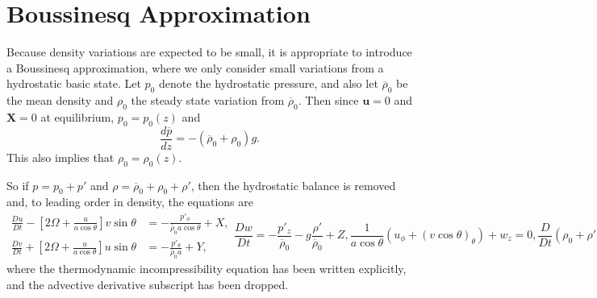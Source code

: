 \documentclass[11pt]{article}
\begin{document}

\section{Boussinesq Approximation}

Because density variations are expected to be small, it is appropriate to introduce a Boussinesq approximation, where we only consider small variations from a hydrostatic basic state. Let $p_0$ denote the hydrostatic pressure, and also let $\overline{\rho}_0$ be the mean density and $\rho_0$ the steady state variation from $\overline{\rho}_0$. Then since $\mathbf{u} = 0$ and $\mathbf{X} = 0$ at equilibrium, $p_0 = p_0(z)$ and
\begin{equation}
\frac{d\overline{p}}{dz} = -\left(\overline{\rho}_0 + \rho_0 \right) g.
\end{equation}
This also implies that $\rho_0 = \rho_0(z)$.

So if $p = p_0 + p'$ and $\rho = \overline{\rho}_0 + \rho_0 + \rho'$, then the hydrostatic balance is removed and, to leading order in density, the equations are
\begin{subequations}
\begin{align}
\frac{Du}{Dt} - \left[2\Omega + \frac{u}{a \cos\theta} \right] v \sin\theta &= - \frac{p'_\phi}{\overline{\rho}_0 a \cos\theta} + X, \\
\frac{Dv}{Dt} + \left[2\Omega + \frac{u}{a \cos\theta} \right] u \sin\theta &= - \frac{p'_{\theta}}{\overline{\rho}_0 a} + Y,
\end{align}
\begin{equation}
\frac{Dw}{Dt} = - \frac{p'_z}{\overline{\rho}_0} - g\frac{\rho'}{\overline{\rho}_0} + Z,
\end{equation}
\begin{equation}
\frac{1}{a \cos\theta}\left(u_{\phi} + \left(v \cos\theta \right)_{\theta} \right) + w_z = 0,
\end{equation}
\begin{equation}
\frac{D}{Dt}\left(\rho_0 + \rho'\right) = 0,
\end{equation}
\end{subequations}
where the thermodynamic incompressibility equation has been written explicitly, and the advective derivative subscript has been dropped.
\end{document}
